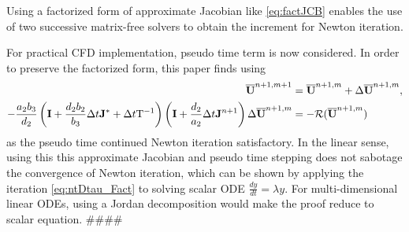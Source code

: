 \documentclass[preprint,12pt]{elsarticle}
\begin{document}
Using a factorized form of approximate
Jacobian like \eqref{eq:factJCB} enables the use of
two successive matrix-free solvers to obtain
the increment for Newton iteration.

For practical CFD implementation,
pseudo time term is now considered.
In order to preserve the factorized form,
this paper finds using
\begin{equation}
    \label{eq:ntDtau_Fact}
    \begin{aligned}
        \overline{\mathbf{U}}^{n+1,m+1}    & =  \overline{\mathbf{U}}^{n+1,m} + \mathrm\Delta \overline{\mathbf{U}}^{n+1,m}, \\
        -\frac{a_2b_3}{d_2}\left(
        \mathbf{I} + \frac{d_2b_2}{b_3}\mathrm\Delta t\mathbf{J}^*
        + \mathrm\Delta t \mathrm{T}^{-1}
        \right)\left(
        \mathbf{I} + \frac{d_2}{a_2}\mathrm\Delta t\mathbf{J}^{n+1}
        \right)
        \mathrm\Delta \overline{\mathbf{U}}^{n+1,m} & = - \mathcal{R}(\overline{\mathbf{U}}^{n+1,m})
    \end{aligned}
\end{equation}
as the pseudo time continued Newton iteration
satisfactory.
In the linear sense, using this this approximate
Jacobian and pseudo time stepping does not sabotage
the convergence of Newton iteration, which can
be shown by applying the iteration \eqref{eq:ntDtau_Fact}
to solving scalar ODE $\frac{dy}{dt} = \lambda y$.
For multi-dimensional linear ODEs, using a Jordan decomposition
would make the proof reduce to scalar equation. \#\#\#\#



\end{document}
